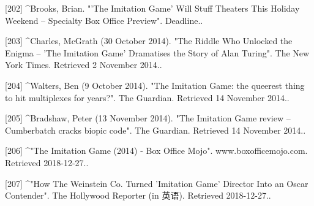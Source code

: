 [202]
^Brooks, Brian. "'The Imitation Game' Will Stuff Theaters This Holiday Weekend – Specialty Box Office Preview". Deadline..

[203]
^Charles, McGrath (30 October 2014). "The Riddle Who Unlocked the Enigma – 'The Imitation Game' Dramatises the Story of Alan Turing". The New York Times. Retrieved 2 November 2014..

[204]
^Walters, Ben (9 October 2014). "The Imitation Game: the queerest thing to hit multiplexes for years?". The Guardian. Retrieved 14 November 2014..

[205]
^Bradshaw, Peter (13 November 2014). "The Imitation Game review – Cumberbatch cracks biopic code". The Guardian. Retrieved 14 November 2014..

[206]
^"The Imitation Game (2014) - Box Office Mojo". www.boxofficemojo.com. Retrieved 2018-12-27..

[207]
^"How The Weinstein Co. Turned 'Imitation Game' Director Into an Oscar Contender". The Hollywood Reporter (in 英语). Retrieved 2018-12-27..